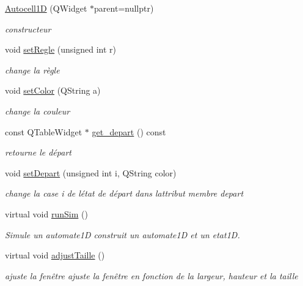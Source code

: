 \begin{DoxyCompactItemize}
\item 
\hyperlink{class_autocell1_d_a4a706f162ed7e0b81f55a3463e355c9c}{Autocell1D} (Q\+Widget $\ast$parent=nullptr)
\begin{DoxyCompactList}\small\item\em constructeur \end{DoxyCompactList}\item 
void \hyperlink{class_autocell1_d_a9591755409ac74ff5564d86af4236a28}{set\+Regle} (unsigned int r)
\begin{DoxyCompactList}\small\item\em change la règle \end{DoxyCompactList}\item 
void \hyperlink{class_autocell1_d_a624d426584e5dbc621416118f09ac528}{set\+Color} (Q\+String a)
\begin{DoxyCompactList}\small\item\em change la couleur \end{DoxyCompactList}\item 
const Q\+Table\+Widget $\ast$ \hyperlink{class_autocell1_d_af724076ad7bd4f512174d63394c89aba}{get\+\_\+depart} () const 
\begin{DoxyCompactList}\small\item\em retourne le départ \end{DoxyCompactList}\item 
void \hyperlink{class_autocell1_d_a4e7c5c216925849a0ba80ea94272b63e}{set\+Depart} (unsigned int i, Q\+String color)
\begin{DoxyCompactList}\small\item\em change la case i de l\textquotesingle{}état de départ dans l\textquotesingle{}attribut membre depart \end{DoxyCompactList}\item 
virtual void \hyperlink{class_autocell1_d_a4793eae53adcca32290621c45a76260c}{run\+Sim} ()
\begin{DoxyCompactList}\small\item\em Simule un automate1D construit un automate1D et un etat1D. \end{DoxyCompactList}\item 
virtual void \hyperlink{class_autocell1_d_ade60b5de205e8890b608baa7b7c4d186}{adjust\+Taille} ()
\begin{DoxyCompactList}\small\item\em ajuste la fenêtre ajuste la fenêtre en fonction de la largeur, hauteur et la taille \end{DoxyCompactList}\item 

\end{DoxyCompactItemize}
